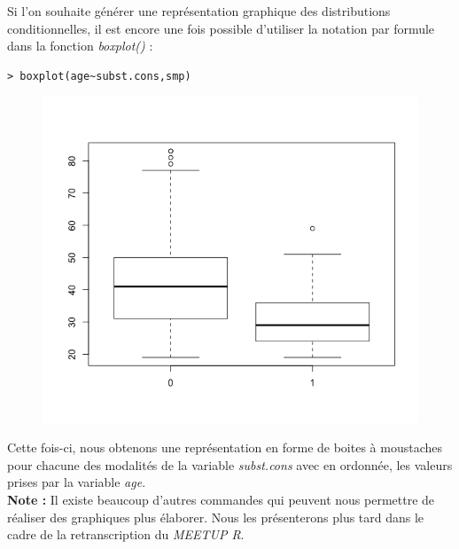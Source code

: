 Si l'on souhaite générer une représentation graphique des distributions conditionnelles, il est encore une fois possible d'utiliser la notation par formule dans la fonction \textit{boxplot()} : 
\begin{lstlisting}[language=html]
> boxplot(age~subst.cons,smp)
\end{lstlisting}

\begin{figure}[H]\begin{center}\includegraphics[scale=0.5]{ilu/ck.png}\end{center}\end{figure}

Cette fois-ci, nous obtenons une représentation en forme de boites à moustaches pour chacune des modalités de la variable \textit{subst.cons} avec en ordonnée, les valeurs prises par la variable \textit{age}.\newline
\\
\textbf{Note : } Il existe beaucoup d'autres commandes qui peuvent nous permettre de réaliser des graphiques plus élaborer. Nous les présenterons plus tard dans le cadre de la retranscription du \textit{MEETUP R}.


\newpage

